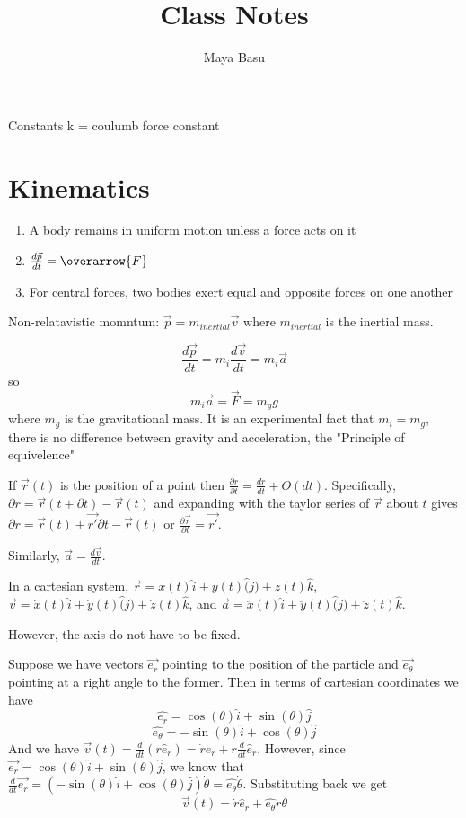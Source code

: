 \documentclass{homework}
\author{Maya Basu}
\title{Class Notes}
\begin{document}
 \maketitle
Constants
k = coulumb force constant
\section{Kinematics}
\begin{enumerate}
    \item A body remains in uniform motion unless a force acts on it
    \item $\frac{d\vec{p}}{dt} = \overarrow{F}$ 
    \item For central forces, two bodies exert equal and opposite forces on one another
\end{enumerate}
Non-relatavistic momntum: $\vec{p} = m_{inertial}\vec{v}$ where $m_{inertial}$ is the inertial mass.

\[\frac{d\vec{p}}{dt} = m_i\frac{d\vec{v}}{dt} = m_i\vec{a}\]
so
\[m_i\vec{a} = \vec{F} = m_gg\]
where $m_g$ is the gravitational mass. It is an experimental fact that $m_i = m_g$, there is no difference between gravity and acceleration, the "Principle of equivelence"


If $\vec{r}(t)$ is the position of a point then $\frac{\partial r}{\partial t} = \frac{dr}{dt} + O(dt)$. Specifically, $\partial r = \vec{r}(t + \partial t) - \vec{r}(t)$ and expanding with the taylor series of $\vec{r}$ about $t$ gives $\partial r = \vec{r}(t) + \vec{r'}\partial t - \vec{r}(t)$ or $\frac{\partial \vec{r}}{\partial t} = \vec{r'}$.

Similarly, $\vec{a} = \frac{d\vec{v}}{dt}$.

In a cartesian system, $\vec{r} = x(t)\hat{i} + y(t)\hat(j) + z(t)\hat{k}$, $\vec{v} = \dot{x}(t)\hat{i} + \dot{y}(t)\hat(j) + \dot{z}(t)\hat{k}$, and  $\vec{a} = \ddot{x}(t)\hat{i} + \ddot{y}(t)\hat(j) + \ddot{z}(t)\hat{k}$.

However, the axis do not have to be fixed. 

Suppose we have vectors $\vec{e_r}$ pointing to the position of the particle and $\vec{e_{\theta}}$ pointing at a right angle to the former. Then in terms of cartesian coordinates we have
\[\hat{e_r} = \cos(\theta)\hat i + \sin (\theta) \hat j\]
\[\hat{e_{\theta}} = -\sin(\theta)\hat i + \cos (\theta) \hat j\]
And we have $\vec{v}(t) = \frac{d}{dt}(r\hat e_r) = \dot r \hat e_r + r \frac{d}{dt}\hat e_r $. However, since $\vec{e_r} = \cos(\theta)\hat i + \sin (\theta) \hat j$, we know that $\frac{d}{dt}\vec{e_r} = (-\sin(\theta)\hat i + \cos (\theta) \hat j)\dot{\theta} = \hat{e_{\theta}}\dot{\theta}$. Substituting back we get 
\[\vec{v}(t) = \dot r \hat e_r + \hat{e_{\theta}}r\dot{\theta}\]
\end{document}

